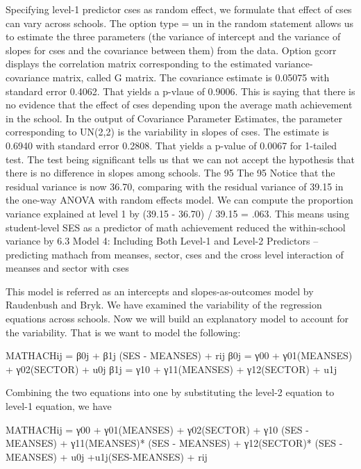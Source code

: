 Specifying level-1 predictor cses as random effect, we formulate that effect of cses can vary across schools.
The option type = un in the random statement allows us to estimate the three parameters (the variance of intercept and the variance of slopes for cses and the covariance between them) from the data.
Option gcorr displays the correlation matrix corresponding to the estimated variance-covariance matrix, called G matrix.
The covariance estimate is 0.05075  with standard error 0.4062. That yields a p-vlaue of 0.9006. This is saying that there is no evidence that the effect of cses depending upon the average math achievement in the school.
In the output of Covariance Parameter Estimates,  the parameter corresponding to UN(2,2) is the variability in slopes of cses. The estimate is  0.6940 with standard error  0.2808. That yields a p-value of 0.0067 for 1-tailed test. The test being significant tells us that we can not accept the hypothesis that there is no difference in slopes among schools.
The 95%
The 95%
Notice that the residual variance is now 36.70, comparing with the residual variance of 39.15 in the one-way ANOVA with random effects model. We can compute the proportion variance explained at level 1 by (39.15 - 36.70) / 39.15 = .063. This means using student-level SES as a predictor of math achievement reduced the within-school variance by 6.3%
Model 4: Including Both Level-1 and Level-2 Predictors --predicting mathach from meanses, sector, cses and the cross level interaction of  meanses and sector with cses

This model is referred as an intercepts and slopes-as-outcomes model by Raudenbush and Bryk. We have examined the variability of the regression equations across schools. Now we will build an explanatory model to account for the variability. That is we want to model the following:

MATHACHij =  β0j + β1j (SES - MEANSES) + rij   
β0j =  γ00  + γ01(MEANSES) + γ02(SECTOR) + u0j
β1j =  γ10  + γ11(MEANSES) + γ12(SECTOR) + u1j

Combining the two equations into one by substituting the level-2 equation to level-1 equation, we have

MATHACHij =   γ00  + γ01(MEANSES) + γ02(SECTOR) + γ10 (SES - MEANSES) + 
                           γ11(MEANSES)* (SES - MEANSES) +  γ12(SECTOR)* (SES - MEANSES) + 
                          u0j  +u1j(SES-MEANSES) +  rij  

